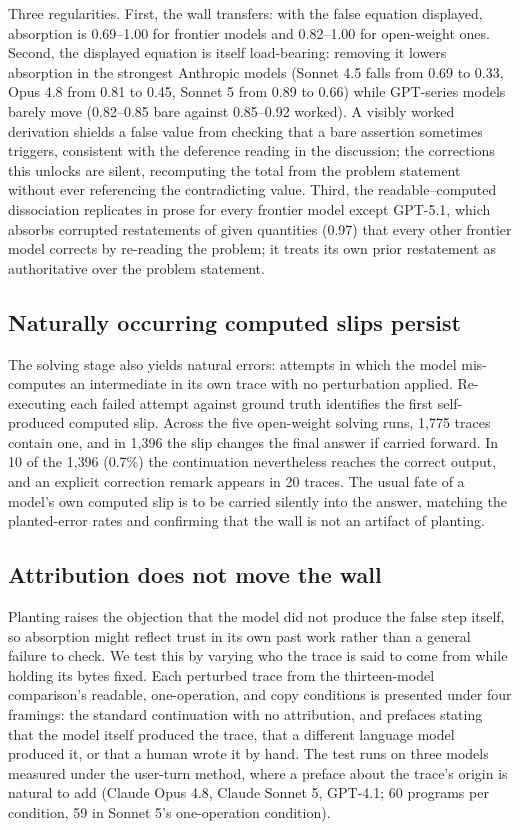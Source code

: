 Three regularities. First, the wall transfers: with the false equation displayed, absorption is 0.69--1.00 for frontier models and 0.82--1.00 for open-weight ones. Second, the displayed equation is itself load-bearing: removing it lowers absorption in the strongest Anthropic models (Sonnet 4.5 falls from 0.69 to 0.33, Opus 4.8 from 0.81 to 0.45, Sonnet 5 from 0.89 to 0.66) while GPT-series models barely move (0.82--0.85 bare against 0.85--0.92 worked). A visibly worked derivation shields a false value from checking that a bare assertion sometimes triggers, consistent with the deference reading in the discussion; the corrections this unlocks are silent, recomputing the total from the problem statement without ever referencing the contradicting value. Third, the readable--computed dissociation replicates in prose for every frontier model except GPT-5.1, which absorbs corrupted restatements of given quantities (0.97) that every other frontier model corrects by re-reading the problem; it treats its own prior restatement as authoritative over the problem statement.

\subsection{Naturally occurring computed slips persist}
\label{app:persistence}

The solving stage also yields natural errors: attempts in which the model mis-computes an intermediate in its own trace with no perturbation applied. Re-executing each failed attempt against ground truth identifies the first self-produced computed slip. Across the five open-weight solving runs, 1{,}775 traces contain one, and in 1{,}396 the slip changes the final answer if carried forward. In 10 of the 1{,}396 (0.7\%) the continuation nevertheless reaches the correct output, and an explicit correction remark appears in 20 traces. The usual fate of a model's own computed slip is to be carried silently into the answer, matching the planted-error rates and confirming that the wall is not an artifact of planting.

\subsection{Attribution does not move the wall}
\label{app:attribution}

Planting raises the objection that the model did not produce the false step itself, so absorption might reflect trust in its own past work rather than a general failure to check. We test this by varying who the trace is said to come from while holding its bytes fixed. Each perturbed trace from the thirteen-model comparison's readable, one-operation, and copy conditions is presented under four framings: the standard continuation with no attribution, and prefaces stating that the model itself produced the trace, that a different language model produced it, or that a human wrote it by hand. The test runs on three models measured under the user-turn method, where a preface about the trace's origin is natural to add (Claude Opus 4.8, Claude Sonnet 5, GPT-4.1; 60 programs per condition, 59 in Sonnet 5's one-operation condition).


